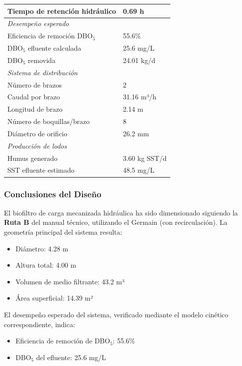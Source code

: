 \documentclass[12pt,a4paper]{article}
\begin{document}
\begin{longtable}{ll}
Tiempo de retención hidráulico & 0.69 h \\
\midrule
\multicolumn{2}{l}{\textit{Desempeño esperado}} \\
Eficiencia de remoción DBO$_5$ & 55.6\% \\
DBO$_5$ efluente calculada & 25.6 mg/L \\
DBO$_5$ removida & 24.01 kg/d \\
\midrule
\multicolumn{2}{l}{\textit{Sistema de distribución}} \\
Número de brazos & 2 \\
Caudal por brazo & 31.16 m³/h \\
Longitud de brazo & 2.14 m \\
Número de boquillas/brazo & 8 \\
Diámetro de orificio & 26.2 mm \\
\midrule
\multicolumn{2}{l}{\textit{Producción de lodos}} \\
Humus generado & 3.60 kg SST/d \\
SST efluente estimado & 48.5 mg/L \\
\end{longtable}
\endgroup

\subsubsection*{Conclusiones del Diseño}

El biofiltro de carga mecanizada hidráulica ha sido dimensionado siguiendo la \textbf{Ruta B} del manual técnico, utilizando el Germain (con recirculación). La geometría principal del sistema resulta:

\begin{itemize}[noitemsep,leftmargin=2em]
    \item Diámetro: 4.28 m
    \item Altura total: 4.00 m
    \item Volumen de medio filtrante: 43.2 m³
    \item Área superficial: 14.39 m²
\end{itemize}

El desempeño esperado del sistema, verificado mediante el modelo cinético correspondiente, indica:

\begin{itemize}[noitemsep,leftmargin=2em]
    \item Eficiencia de remoción de DBO$_5$: 55.6\%
    \item DBO$_5$ del efluente: 25.6 mg/L

\end{itemize}
\end{document}
